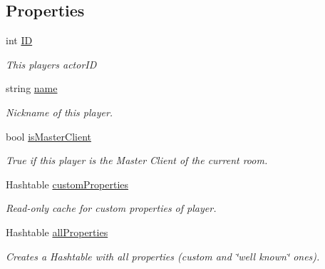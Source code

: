 \subsection*{Properties}
\begin{DoxyCompactItemize}
\item 
int \hyperlink{class_photon_player_ac363d86e7c6ea63573e0ecfda7f7eaa7}{ID}
\begin{DoxyCompactList}\small\item\em This player\textquotesingle{}s actor\+ID\end{DoxyCompactList}\item 
string \hyperlink{class_photon_player_a74e5bb916dbfdb6960b8f2f11fa6aba9}{name}
\begin{DoxyCompactList}\small\item\em Nickname of this player. \end{DoxyCompactList}\item 
bool \hyperlink{class_photon_player_ade88a2875960de99e5ab98fc6db1650c}{is\+Master\+Client}
\begin{DoxyCompactList}\small\item\em True if this player is the Master Client of the current room. \end{DoxyCompactList}\item 
Hashtable \hyperlink{class_photon_player_ab7e0bc6125b15524e74b5ac9d7c337d7}{custom\+Properties}
\begin{DoxyCompactList}\small\item\em Read-\/only cache for custom properties of player. \end{DoxyCompactList}\item 
Hashtable \hyperlink{class_photon_player_a82ba921802edc4960d075f1deacfb19d}{all\+Properties}
\begin{DoxyCompactList}\small\item\em Creates a Hashtable with all properties (custom and \char`\"{}well known\char`\"{} ones). \end{DoxyCompactList}\end{DoxyCompactItemize}


